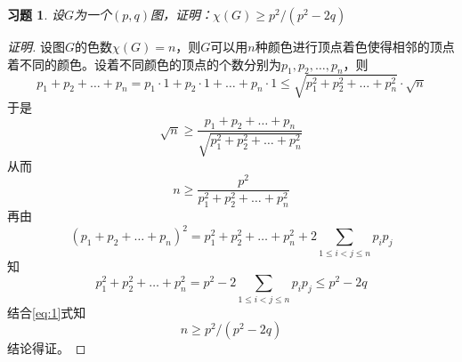 \documentclass{article}
\begin{document}
\begin{CJK}{UTF8}{gbsn}
\newtheorem*{Exercise}{习题}
\begin{Exercise}设$G$为一个$(p,q)$图，证明：$\chi(G) \geq p^2/(p^2-2q)$
\end{Exercise}
\begin{proof}[证明]  设图$G$的色数$\chi(G)=n$，则$G$可以用$n$种颜色进行顶点着色使得相邻的顶点着不同的颜色。设着不同颜色的顶点的个数分别为$p_1,p_2,\ldots,p_n$，则
  \[p_1+p_2+\ldots +p_n = p_1 \cdot 1 + p_2\cdot 1 + \ldots + p_n\cdot 1 \leq \sqrt{p_1^2 + p_2^2 + \ldots + p_n^2} \cdot \sqrt{n}\]
  于是
  \[\sqrt{n} \geq \frac{p_1+p_2+\ldots + p_n}{\sqrt{p_1^2 + p_2^2 + \ldots + p_n^2}}\]
  从而
  \begin{equation}
    \label{eq:1}
  n \geq \frac{p^2}{p_1^2 + p_2^2 + \ldots + p_n^2}    
  \end{equation}
  再由
  \[(p_1+p_2+\ldots + p_n)^2 = p_1^2 + p_2^2 + \ldots + p_n^2 + 2\sum_{1\leq i<j\leq n}p_ip_j\]
  知
  \[p_1^2 + p_2^2 + \ldots + p_n^2=p^2-2\sum_{1\leq i<j\leq n}p_ip_j\leq p^2-2q\]
  结合\eqref{eq:1}式知
  \[n \geq p^2/(p^2-2q)\]
  结论得证。
\end{proof}

\end{CJK}
\end{document}
